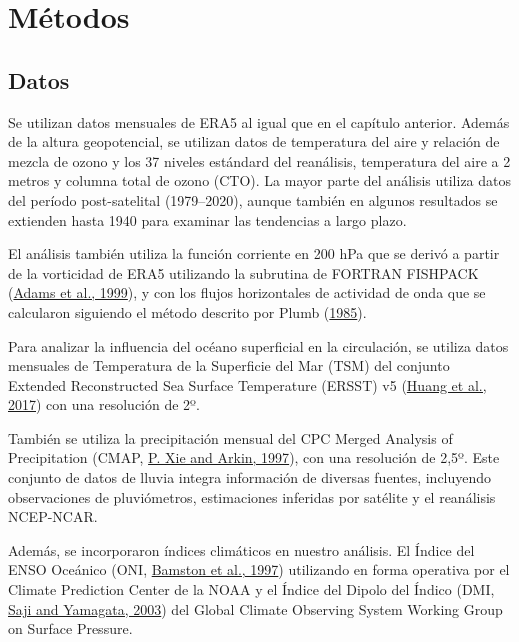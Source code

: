 \documentclass[12pt,oneside,a4paper]{reedthesis}
\begin{document}
\hypertarget{muxe9todos-1}{%
\section{Métodos}\label{muxe9todos-1}}

\hypertarget{datos-1}{%
\subsection{Datos}\label{datos-1}}

Se utilizan datos mensuales de ERA5 al igual que en el capítulo anterior.
Además de la altura geopotencial, se utilizan datos de temperatura del aire y relación de mezcla de ozono y los 37 niveles estándard del reanálisis, temperatura del aire a 2 metros y columna total de ozono (CTO).
La mayor parte del análisis utiliza datos del período post-satelital (1979--2020), aunque también en algunos resultados se extienden hasta 1940 para examinar las tendencias a largo plazo.

El análisis también utiliza la función corriente en 200 hPa que se derivó a partir de la vorticidad de ERA5 utilizando la subrutina de FORTRAN FISHPACK (\protect\hyperlink{ref-fishpack}{Adams et al., 1999}), y con los flujos horizontales de actividad de onda que se calcularon siguiendo el método descrito por Plumb (\protect\hyperlink{ref-plumb1985}{1985}).

Para analizar la influencia del océano superficial en la circulación, se utiliza datos mensuales de Temperatura de la Superficie del Mar (TSM) del conjunto Extended Reconstructed Sea Surface Temperature (ERSST) v5 (\protect\hyperlink{ref-huang2017}{Huang et al., 2017}) con una resolución de 2º.

También se utiliza la precipitación mensual del CPC Merged Analysis of Precipitation (CMAP, \protect\hyperlink{ref-xie1997}{P. Xie and Arkin, 1997}), con una resolución de 2,5º.
Este conjunto de datos de lluvia integra información de diversas fuentes, incluyendo observaciones de pluviómetros, estimaciones inferidas por satélite y el reanálisis NCEP-NCAR.

Además, se incorporaron índices climáticos en nuestro análisis.
El Índice del ENSO Oceánico (ONI, \protect\hyperlink{ref-bamston1997}{Bamston et al., 1997}) utilizando en forma operativa por el Climate Prediction Center de la NOAA y el Índice del Dipolo del Índico (DMI, \protect\hyperlink{ref-saji2003}{Saji and Yamagata, 2003}) del Global Climate Observing System Working Group on Surface Pressure.
\end{document}

